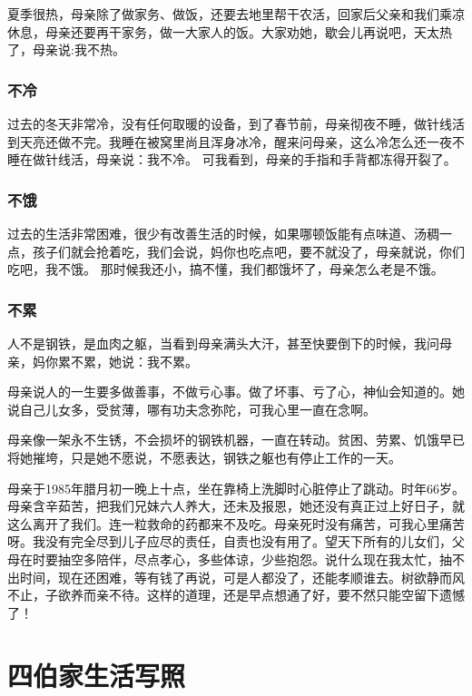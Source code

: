 夏季很热，母亲除了做家务、做饭，还要去地里帮干农活，回家后父亲和我们乘凉休息，母亲还要再干家务，做一大家人的饭。大家劝她，歇会儿再说吧，天太热了，母亲说:我不热。


\subsubsection*{不冷}

过去的冬天非常冷，没有任何取暖的设备，到了春节前，母亲彻夜不睡，做针线活到天亮还做不完。我睡在被窝里尚且浑身冰冷，醒来问母亲，这么冷怎么还一夜不睡在做针线活，母亲说：我不冷。 可我看到，母亲的手指和手背都冻得开裂了。


\subsubsection*{不饿}

过去的生活非常困难，很少有改善生活的时候，如果哪顿饭能有点味道、汤稠一点，孩子们就会抢着吃，我们会说，妈你也吃点吧，要不就没了，母亲就说，你们吃吧，我不饿。 那时候我还小，搞不懂，我们都饿坏了，母亲怎么老是不饿。


\subsubsection*{不累}

人不是钢铁，是血肉之躯，当看到母亲满头大汗，甚至快要倒下的时候，我问母亲，妈你累不累，她说：我不累。

母亲说人的一生要多做善事，不做亏心事。做了坏事、亏了心，神仙会知道的。她说自己儿女多，受贫薄，哪有功夫念弥陀，可我心里一直在念啊。

母亲像一架永不生锈，不会损坏的钢铁机器，一直在转动。贫困、劳累、饥饿早已将她摧垮，只是她不愿说，不愿表达，钢铁之躯也有停止工作的一天。

母亲于1985年腊月初一晚上十点，坐在靠椅上洗脚时心脏停止了跳动。时年66岁。母亲含辛茹苦，把我们兄妹六人养大，还未及报恩，她还没有真正过上好日子，就这么离开了我们。连一粒救命的药都来不及吃。母亲死时没有痛苦，可我心里痛苦呀。我没有完全尽到儿子应尽的责任，自责也没有用了。望天下所有的儿女们，父母在时要抽空多陪伴，尽点孝心，多些体谅，少些抱怨。说什么现在我太忙，抽不出时间，现在还困难，等有钱了再说，可是人都没了，还能孝顺谁去。树欲静而风不止，子欲养而亲不待。这样的道理，还是早点想通了好，要不然只能空留下遗憾了！


\section*{四伯家生活写照}

